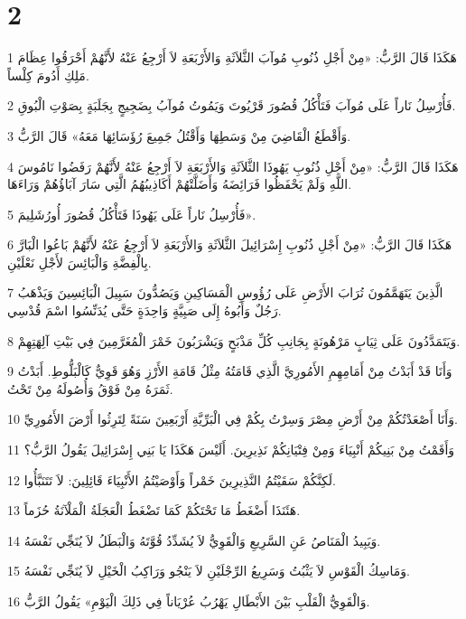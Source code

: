 \chapter{2}

\par 1 هَكَذَا قَالَ الرَّبُّ: «مِنْ أَجْلِ ذُنُوبِ مُوآبَ الثَّلاَثَةِ وَالأَرْبَعَةِ لاَ أَرْجِعُ عَنْهُ لأَنَّهُمْ أَحْرَقُوا عِظَامَ مَلِكِ أَدُومَ كِلْساً.
\par 2 فَأُرْسِلُ نَاراً عَلَى مُوآبَ فَتَأْكُلُ قُصُورَ قَرْيُوتَ وَيَمُوتُ مُوآبُ بِضَجِيجٍ بِجَلَبَةٍ بِصَوْتِ الْبُوقِ.
\par 3 وَأَقْطَعُ الْقَاضِيَ مِنْ وَسَطِهَا وَأَقْتُلُ جَمِيعَ رُؤَسَائِهَا مَعَهُ» قَالَ الرَّبُّ.
\par 4 هَكَذَا قَالَ الرَّبُّ: «مِنْ أَجْلِ ذُنُوبِ يَهُوذَا الثَّلاَثَةِ وَالأَرْبَعَةِ لاَ أَرْجِعُ عَنْهُ لأَنَّهُمْ رَفَضُوا نَامُوسَ اللَّهِ وَلَمْ يَحْفَظُوا فَرَائِضَهُ وَأَضَلَّتْهُمْ أَكَاذِيبُهُمُ الَّتِي سَارَ آبَاؤُهُمْ وَرَاءَهَا.
\par 5 فَأُرْسِلُ نَاراً عَلَى يَهُوذَا فَتَأْكُلُ قُصُورَ أُورُشَلِيمَ».
\par 6 هَكَذَا قَالَ الرَّبُّ: «مِنْ أَجْلِ ذُنُوبِ إِسْرَائِيلَ الثَّلاَثَةِ وَالأَرْبَعَةِ لاَ أَرْجِعُ عَنْهُ لأَنَّهُمْ بَاعُوا الْبَارَّ بِالْفِضَّةِ وَالْبَائِسَ لأَجْلِ نَعْلَيْنِ.
\par 7 الَّذِينَ يَتَهَمَّمُونَ تُرَابَ الأَرْضِ عَلَى رُؤُوسِ الْمَسَاكِينِ وَيَصُدُّونَ سَبِيلَ الْبَائِسِينَ وَيَذْهَبُ رَجُلٌ وَأَبُوهُ إِلَى صَبِيَّةٍ وَاحِدَةٍ حَتَّى يُدَنِّسُوا اسْمَ قُدْسِي.
\par 8 وَيَتَمَدَّدُونَ عَلَى ثِيَابٍ مَرْهُونَةٍ بِجَانِبِ كُلِّ مَذْبَحٍ وَيَشْرَبُونَ خَمْرَ الْمُغَرَّمِينَ فِي بَيْتِ آلِهَتِهِمْ.
\par 9 وَأَنَا قَدْ أَبَدْتُ مِنْ أَمَامِهِمِ الأَمُورِيَّ الَّذِي قَامَتُهُ مِثْلُ قَامَةِ الأَرْزِ وَهُوَ قَوِيٌّ كَالْبَلُّوطِ. أَبَدْتُ ثَمَرَهُ مِنْ فَوْقُ وَأُصُولَهُ مِنْ تَحْتُ.
\par 10 وَأَنَا أَصْعَدْتُكُمْ مِنْ أَرْضِ مِصْرَ وَسِرْتُ بِكُمْ فِي الْبَرِّيَّةِ أَرْبَعِينَ سَنَةً لِتَرِثُوا أَرْضَ الأَمُورِيِّ.
\par 11 وَأَقَمْتُ مِنْ بَنِيكُمْ أَنْبِيَاءَ وَمِنْ فِتْيَانِكُمْ نَذِيرِينَ. أَلَيْسَ هَكَذَا يَا بَنِي إِسْرَائِيلَ يَقُولُ الرَّبُّ؟
\par 12 لَكِنَّكُمْ سَقَيْتُمُ النَّذِيرِينَ خَمْراً وَأَوْصَيْتُمُ الأَنْبِيَاءَ قَائِلِينَ: لاَ تَتَنَبَّأُوا.
\par 13 هَئَنَذَا أَضْغَطُ مَا تَحْتَكُمْ كَمَا تَضْغَطُ الْعَجَلَةُ الْمَلْآنَةُ حُزَماً.
\par 14 وَيَبِيدُ الْمَنَاصُ عَنِ السَّرِيعِ وَالْقَوِيُّ لاَ يُشَدِّدُ قُوَّتَهُ وَالْبَطَلُ لاَ يُنَجِّي نَفْسَهُ.
\par 15 وَمَاسِكُ الْقَوْسِ لاَ يَثْبُتُ وَسَرِيعُ الرِّجْلَيْنِ لاَ يَنْجُو وَرَاكِبُ الْخَيْلِ لاَ يُنَجِّي نَفْسَهُ.
\par 16 وَالْقَوِيُّ الْقَلْبِ بَيْنَ الأَبْطَالِ يَهْرُبُ عُرْيَاناً فِي ذَلِكَ الْيَوْمِ» يَقُولُ الرَّبُّ.

